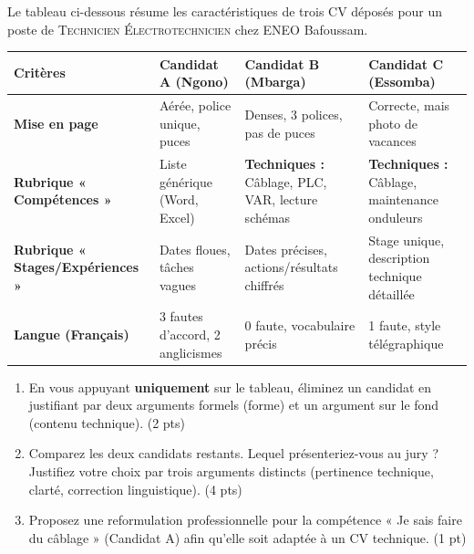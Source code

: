 \documentclass[11pt]{article}
\begin{document}
\begin{exercice}
Le tableau ci-dessous résume les caractéristiques de trois CV déposés pour un poste de \textsc{Technicien Électrotechnicien} chez \textsc{ENEO} Bafoussam.\\

\begin{tabularx}{\linewidth}{>{\bfseries}lXXX}
\toprule
\textbf{Critères} & \textbf{Candidat A (Ngono)} & \textbf{Candidat B (Mbarga)} & \textbf{Candidat C (Essomba)} \\
\midrule
Mise en page & Aérée, police unique, puces & Denses, 3 polices, pas de puces & Correcte, mais photo de vacances \\
Rubrique « Compétences » & Liste générique (Word, Excel) & \textbf{Techniques :} Câblage, PLC, VAR, lecture schémas & \textbf{Techniques :} Câblage, maintenance onduleurs \\
Rubrique « Stages/Expériences » & Dates floues, tâches vagues & Dates précises, actions/résultats chiffrés & Stage unique, description technique détaillée \\
Langue (Français) & 3 fautes d'accord, 2 anglicismes & 0 faute, vocabulaire précis & 1 faute, style télégraphique \\
\bottomrule
\end{tabularx}

\begin{enumerate}
    \item En vous appuyant \textbf{uniquement} sur le tableau, éliminez un candidat en justifiant par deux arguments formels (forme) et un argument sur le fond (contenu technique). (2 pts)
    \item Comparez les deux candidats restants. Lequel présenteriez-vous au jury ? Justifiez votre choix par trois arguments distincts (pertinence technique, clarté, correction linguistique). (4 pts)
    \item Proposez une reformulation professionnelle pour la compétence « Je sais faire du câblage » (Candidat A) afin qu'elle soit adaptée à un CV technique. (1 pt)
\end{enumerate}
\end{exercice}
\end{document}
